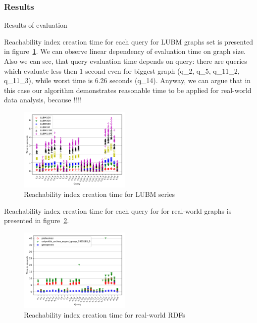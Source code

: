 \subsubsection{Results}

Results of evaluation

Reachability index creation time for each query for LUBM graphs set is presented in figure~\ref{fig:lubm_all_qs}.
We can observe linear dependency of evaluation time on graph size.
Also we can see, that query evaluation time depends on query: there are queries which evaluate less then 1 second even for biggest graph (q\_2, q\_5, q\_11\_2, q\_11\_3), while worst time is 6.26 seconds (q\_14).
Anyway, we can argue that in this case our algorithm demonstrates reasonable time to be applied for real-world data analysis, because  !!!!

\begin{figure}
   \includegraphics[width=0.48\textwidth]{data/LUBM_all.pdf}
   \caption{Reachability index creation time for LUBM series}
   \label{fig:lubm_all_qs}
\end{figure}


Reachability index creation time for each query for for real-world graphs is presented in figure~\ref{fig:other_all_qs}.

\begin{figure}
   \includegraphics[width=0.48\textwidth]{data/other_all.pdf}
   \caption{Reachability index creation time for real-world RDFs}
   \label{fig:other_all_qs}
\end{figure}

